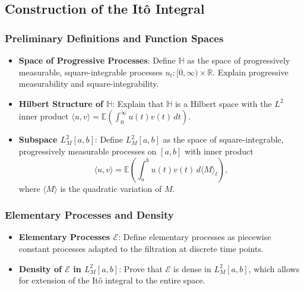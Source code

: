

\subsection{Construction of the Itô Integral}

\subsubsection{Preliminary Definitions and Function Spaces}
\begin{itemize}
    \item \textbf{Space of Progressive Processes}: Define $\mathbb{H}$ as the space of progressively measurable, square-integrable processes $u_t: [0, \infty) \times \mathbb{R}$. Explain progressive measurability and square-integrability.
    \item \textbf{Hilbert Structure of $\mathbb{H}$}: Explain that $\mathbb{H}$ is a Hilbert space with the $L^2$ inner product $\langle u, v \rangle = \mathbb{E} \left( \int_0^\infty u(t) v(t) \, dt \right)$.
    \item \textbf{Subspace $L^2_M[a,b]$}: Define $L^2_M[a,b]$ as the space of square-integrable, progressively measurable processes on $[a, b]$ with inner product
    \[
    \langle u, v \rangle = \mathbb{E} \left( \int_a^b u(t) v(t) \, d\langle M \rangle_t \right),
    \]
    where $\langle M \rangle$ is the quadratic variation of $M$.
\end{itemize}

\subsubsection{Elementary Processes and Density}
\begin{itemize}
    \item \textbf{Elementary Processes $\mathcal{E}$}: Define elementary processes as piecewise constant processes adapted to the filtration at discrete time points.
    \item \textbf{Density of $\mathcal{E}$ in $L^2_M[a,b]$}: Prove that $\mathcal{E}$ is dense in $L^2_M[a,b]$, which allows for extension of the Itô integral to the entire space.
\end{itemize}

